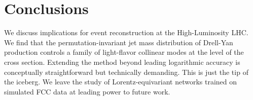 \section{Conclusions}\label{sec:conclusions}

We discuss implications for event reconstruction at the High-Luminosity
LHC. We find that the permutation-invariant jet mass distribution of
Drell-Yan production controls a family of light-flavor collinear modes
at the level of the cross section. Extending the method beyond leading
logarithmic accuracy is conceptually straightforward but technically
demanding. This is just the tip of the iceberg. We leave the study of
Lorentz-equivariant networks trained on simulated FCC data at leading
power to future work.

